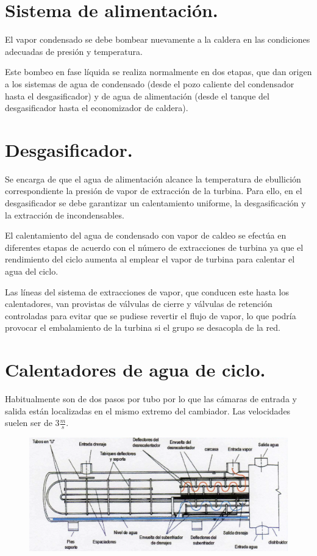 \section{Sistema de alimentación.}
El vapor condensado se debe bombear nuevamente a la caldera en las condiciones adecuadas de presión y temperatura.



Este bombeo en fase líquida se realiza normalmente en dos etapas, que dan origen a los
sistemas de agua de condensado (desde el pozo caliente del condensador hasta el
desgasificador) y de agua de alimentación (desde el tanque del desgasificador hasta el
economizador de caldera).
\section{Desgasificador.}
Se encarga de que el agua de alimentación  alcance la temperatura de ebullición correspondiente la presión de vapor de
extracción de la turbina. Para ello, en el desgasificador se debe garantizar un calentamiento uniforme, la desgasificación y la extracción de incondensables.


El calentamiento del agua de condensado con vapor de caldeo se efectúa en diferentes
etapas de acuerdo con el número de extracciones de turbina ya que el rendimiento del ciclo aumenta al emplear el vapor de turbina para calentar el agua del
ciclo.



Las líneas del sistema de extracciones de vapor, que conducen este hasta los calentadores,
van provistas de válvulas de cierre y válvulas de retención controladas para evitar que se
pudiese revertir el flujo de vapor, lo que podría provocar el embalamiento de la turbina si el
grupo se desacopla de la red.


\section{Calentadores de agua de ciclo.}
Habitualmente son de dos pasos por tubo por lo que las cámaras de entrada y salida están
localizadas en el mismo extremo del cambiador. Las velocidades suelen ser de 3$\frac{m}{s}$.
\begin{figure}[H]
	\centering
	\includegraphics[width=1\linewidth]{res/tema10/calentador}
	\label{fig:calentador}
\end{figure}

